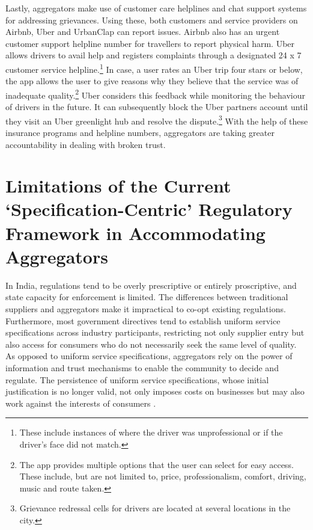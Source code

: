 \documentclass[a4paper, 12pt]{article}
\begin{document}
Lastly, aggregators make use of customer care helplines and chat support systems for addressing grievances. Using these, both customers and service providers on Airbnb, Uber and UrbanClap can report issues. Airbnb also has an urgent customer support helpline number for travellers to report physical harm. Uber allows drivers to avail help and registers complaints through a designated 24 x 7 customer service helpline.\footnote{These include instances of where the driver was unprofessional or if the driver’s face did not match.}  In case, a user rates an Uber trip four stars or below, the app allows the user to give reasons why they believe that the service was of inadequate quality.\footnote{The app provides multiple options that the user can select for easy access. These include, but are not limited to, price, professionalism, comfort, driving, music and route taken.} Uber considers this feedback while monitoring the behaviour of drivers in the future. It can subsequently block the Uber partners account until they visit an Uber greenlight hub and resolve the dispute.\footnote{Grievance redressal cells for drivers are located at several locations in the city.}  With the help of these insurance programs and helpline numbers, aggregators are taking greater accountability in dealing with broken trust.

                    \section{Limitations of the Current ‘Specification-Centric’ Regulatory Framework in Accommodating Aggregators}
In India, regulations tend to be overly prescriptive or entirely proscriptive, and state capacity for enforcement is limited. The differences between traditional suppliers and aggregators make it impractical to co-opt existing regulations. Furthermore, most government directives tend to establish uniform service specifications across industry participants, restricting not only supplier entry but also access for consumers who do not necessarily seek the same level of quality. As opposed to uniform service specifications, aggregators rely on the power of information and trust mechanisms to enable the community to decide and regulate. The persistence of uniform service specifications, whose initial justification is no longer valid, not only imposes costs on businesses but may also work against the interests of consumers \parencite{koopman2014sharing}. \\  
\end{document}
